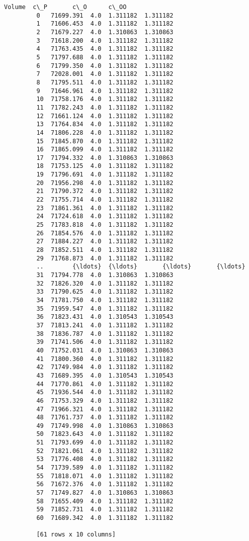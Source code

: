 \documentclass[11pt]{article}
\begin{document}
\begin{Verbatim}[commandchars=\\\{\}]
                Volume  c\_P       c\_O      c\_OO  
         0   71699.391  4.0  1.311182  1.311182  
         1   71606.453  4.0  1.311182  1.311182  
         2   71679.227  4.0  1.310863  1.310863  
         3   71618.200  4.0  1.311182  1.311182  
         4   71763.435  4.0  1.311182  1.311182  
         5   71797.688  4.0  1.311182  1.311182  
         6   71799.350  4.0  1.311182  1.311182  
         7   72028.001  4.0  1.311182  1.311182  
         8   71795.511  4.0  1.311182  1.311182  
         9   71646.961  4.0  1.311182  1.311182  
         10  71758.176  4.0  1.311182  1.311182  
         11  71782.243  4.0  1.311182  1.311182  
         12  71661.124  4.0  1.311182  1.311182  
         13  71764.834  4.0  1.311182  1.311182  
         14  71806.228  4.0  1.311182  1.311182  
         15  71845.870  4.0  1.311182  1.311182  
         16  71865.099  4.0  1.311182  1.311182  
         17  71794.332  4.0  1.310863  1.310863  
         18  71753.125  4.0  1.311182  1.311182  
         19  71796.691  4.0  1.311182  1.311182  
         20  71956.298  4.0  1.311182  1.311182  
         21  71790.372  4.0  1.311182  1.311182  
         22  71755.714  4.0  1.311182  1.311182  
         23  71861.361  4.0  1.311182  1.311182  
         24  71724.618  4.0  1.311182  1.311182  
         25  71783.818  4.0  1.311182  1.311182  
         26  71854.576  4.0  1.311182  1.311182  
         27  71884.227  4.0  1.311182  1.311182  
         28  71852.511  4.0  1.311182  1.311182  
         29  71768.873  4.0  1.311182  1.311182  
         ..        {\ldots}  {\ldots}       {\ldots}       {\ldots}  
         31  71794.778  4.0  1.310863  1.310863  
         32  71826.320  4.0  1.311182  1.311182  
         33  71790.625  4.0  1.311182  1.311182  
         34  71781.750  4.0  1.311182  1.311182  
         35  71959.547  4.0  1.311182  1.311182  
         36  71823.431  4.0  1.310543  1.310543  
         37  71813.241  4.0  1.311182  1.311182  
         38  71836.787  4.0  1.311182  1.311182  
         39  71741.506  4.0  1.311182  1.311182  
         40  71752.031  4.0  1.310863  1.310863  
         41  71800.360  4.0  1.311182  1.311182  
         42  71749.984  4.0  1.311182  1.311182  
         43  71689.395  4.0  1.310543  1.310543  
         44  71770.861  4.0  1.311182  1.311182  
         45  71936.544  4.0  1.311182  1.311182  
         46  71753.329  4.0  1.311182  1.311182  
         47  71966.321  4.0  1.311182  1.311182  
         48  71761.737  4.0  1.311182  1.311182  
         49  71749.998  4.0  1.310863  1.310863  
         50  71823.643  4.0  1.311182  1.311182  
         51  71793.699  4.0  1.311182  1.311182  
         52  71821.061  4.0  1.311182  1.311182  
         53  71776.408  4.0  1.311182  1.311182  
         54  71739.589  4.0  1.311182  1.311182  
         55  71818.071  4.0  1.311182  1.311182  
         56  71672.376  4.0  1.311182  1.311182  
         57  71749.827  4.0  1.310863  1.310863  
         58  71655.409  4.0  1.311182  1.311182  
         59  71852.731  4.0  1.311182  1.311182  
         60  71689.342  4.0  1.311182  1.311182  
         
         [61 rows x 10 columns]
\end{Verbatim}
            
\end{document}
